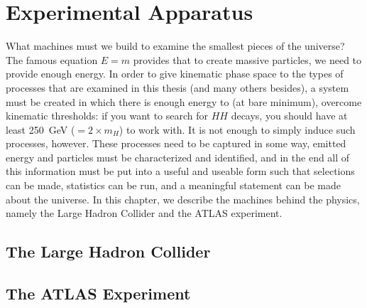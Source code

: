 \chapter{Experimental Apparatus}
\label{chap:experiment}

What machines must we build to examine the smallest pieces of the universe? The famous equation 
$E = m$ provides that to create massive particles, we need to provide enough energy. In order to give 
kinematic phase space to the types of processes that are examined in this thesis (and many others besides),
a system must be created in which there is enough energy to (at bare minimum), overcome kinematic thresholds:
if you want to search for $HH$ decays, you should have at least \SI{250}{\GeV} ($= 2\times m_{H}$) to work with.
It is not enough to simply induce such processes, however. These processes need to be captured in some way, emitted 
energy and particles must be characterized and identified, and in the end all of this information must be put into a 
useful and useable form such that selections can be made, statistics can be run, and a meaningful statement 
can be made about the universe. In this chapter, we describe the machines behind the physics, namely the Large 
Hadron Collider and the ATLAS experiment.

\section{The Large Hadron Collider}


\section{The ATLAS Experiment}

\section{}

\newcommand{\AtlasCoordFootnote}{%
ATLAS uses a right-handed coordinate system with its origin at the nominal interaction point (IP)
in the centre of the detector and the \(z\)-axis along the beam pipe.
The \(x\)-axis points from the IP to the centre of the LHC ring,
and the \(y\)-axis points upwards.
Cylindrical coordinates \((r,\phi)\) are used in the transverse plane, 
\(\phi\) being the azimuthal angle around the \(z\)-axis.
The pseudorapidity is defined in terms of the polar angle \(\theta\) as \(\eta = -\ln \tan(\theta/2)\).
Angular distance is measured in units of \(\Delta R \equiv \sqrt{(\Delta\eta)^{2} + (\Delta\phi)^{2}}\).}


